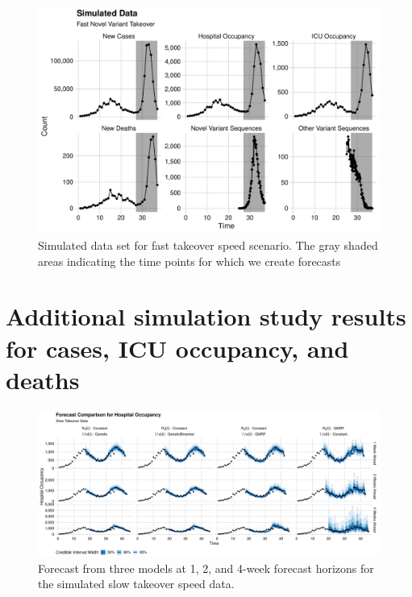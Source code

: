 \begin{figure}
    \centering
    \includegraphics[width=1.0\columnwidth]{simulated_binned_data_fast_plot}
    \caption[Simulated data set for fast takeover speed scenario.]{Simulated data set for fast takeover speed scenario.
    The gray shaded areas indicating the time points for which we create forecasts}
    \label{ch_5:fig:simulated_binned_data_fast_plot}
\end{figure}

\section{Additional simulation study results for cases, ICU occupancy, and deaths}
\label{ch_5:sec:sim_cases_icu_death}

\begin{figure}
    \centering
    \includegraphics[width=1.0\columnwidth]{simulated_forecast_comparison_data_hospitalizations_slow_plot}
    \caption{Forecast from three models at 1, 2, and 4-week forecast horizons for the simulated slow takeover speed data.}
    \label{ch_5:fig:simulated_forecast_comparison_data_hospitalizations_slow_plot}
\end{figure}

